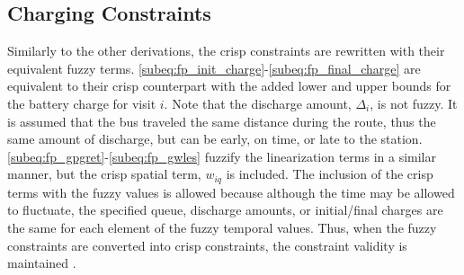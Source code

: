 \documentclass[11pt,a4paper,final]{article}
\begin{document}
\subsection{Charging Constraints}
\label{sec:org966798c}
Similarly to the other derivations, the crisp constraints are rewritten with their equivalent fuzzy terms.
\ref{subeq:fp_init_charge}-\ref{subeq:fp_final_charge} are equivalent to their crisp counterpart with the added lower
and upper bounds for the battery charge for visit \(i\). Note that the discharge amount, \(\Delta_i\), is not fuzzy. It is
assumed that the bus traveled the same distance during the route, thus the same amount of discharge, but can be early,
on time, or late to the station. \ref{subeq:fp_gpgret}-\ref{subeq:fp_gwles} fuzzify the linearization terms in a similar
manner, but the crisp spatial term, \(w_{iq}\) is included. The inclusion of the crisp terms with the fuzzy values is
allowed because although the time may be allowed to fluctuate, the specified queue, discharge amounts, or initial/final
charges are the same for each element of the fuzzy temporal values. Thus, when the fuzzy constraints are converted into
crisp constraints, the constraint validity is maintained \cite{ghanbari-2019-fuzzy}.
\end{document}
